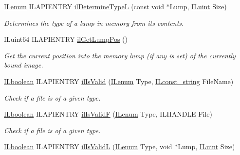 \begin{DoxyCompactItemize}
\hyperlink{group__il__types_ga62ca73445716183ef42b1f3906a45ed0}{I\+Lenum} I\+L\+A\+P\+I\+E\+N\+T\+R\+Y \hyperlink{group__file_ga706207244bcf99e76f299c5e43800300}{il\+Determine\+Type\+L} (const void $\ast$Lump, \hyperlink{group__il__types_gaff8e86a1072c8d7cfe387fb87c6ed8e1}{I\+Luint} Size)
\begin{DoxyCompactList}\small\item\em Determines the type of a lump in memory from its contents. \end{DoxyCompactList}\item 
\hypertarget{group__file_gad3dba757768898d1833540d6c7a3686b}{I\+Luint64 I\+L\+A\+P\+I\+E\+N\+T\+R\+Y \hyperlink{group__file_gad3dba757768898d1833540d6c7a3686b}{il\+Get\+Lump\+Pos} ()}\label{group__file_gad3dba757768898d1833540d6c7a3686b}

\begin{DoxyCompactList}\small\item\em Get the current position into the memory lump (if any is set) of the currently bound image. \end{DoxyCompactList}\item 
\hyperlink{group__il__types_gaa6aa7c95cfdc06b4d8601ef832b7bb0a}{I\+Lboolean} I\+L\+A\+P\+I\+E\+N\+T\+R\+Y \hyperlink{group__file_ga41b3e8904b94c4b4956a99cdaeda99ae}{il\+Is\+Valid} (\hyperlink{group__il__types_ga62ca73445716183ef42b1f3906a45ed0}{I\+Lenum} Type, \hyperlink{group__il__types_ga1aa1edc3eb344e14acacb02bade24a5a}{I\+Lconst\+\_\+string} File\+Name)
\begin{DoxyCompactList}\small\item\em Check if a file is of a given type. \end{DoxyCompactList}\item 
\hyperlink{group__il__types_gaa6aa7c95cfdc06b4d8601ef832b7bb0a}{I\+Lboolean} I\+L\+A\+P\+I\+E\+N\+T\+R\+Y \hyperlink{group__file_ga758c5fd4ff61cd47530442cfac50f4c3}{il\+Is\+Valid\+F} (\hyperlink{group__il__types_ga62ca73445716183ef42b1f3906a45ed0}{I\+Lenum} Type, I\+L\+H\+A\+N\+D\+L\+E File)
\begin{DoxyCompactList}\small\item\em Check if a file is of a given type. \end{DoxyCompactList}\item 
\hyperlink{group__il__types_gaa6aa7c95cfdc06b4d8601ef832b7bb0a}{I\+Lboolean} I\+L\+A\+P\+I\+E\+N\+T\+R\+Y \hyperlink{group__file_ga6ab6e9cdafb45c65570c5ed5eb0fde57}{il\+Is\+Valid\+L} (\hyperlink{group__il__types_ga62ca73445716183ef42b1f3906a45ed0}{I\+Lenum} Type, void $\ast$Lump, \hyperlink{group__il__types_gaff8e86a1072c8d7cfe387fb87c6ed8e1}{I\+Luint} Size)

\end{DoxyCompactItemize}
